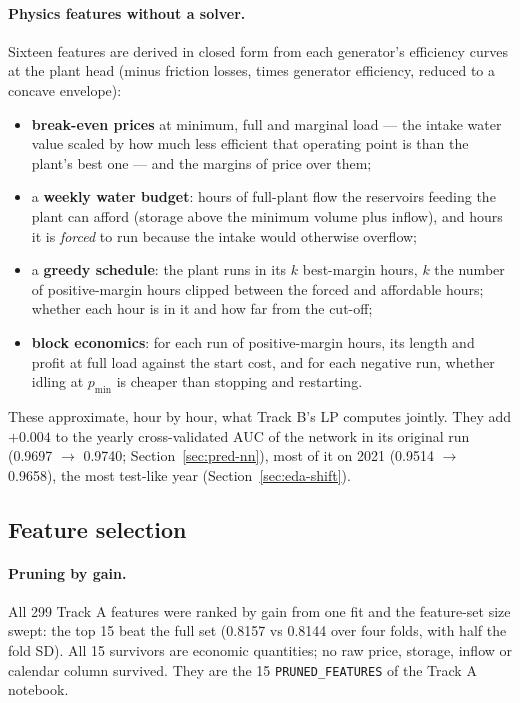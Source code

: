 \documentclass[11pt]{article}
\begin{document}
\paragraph{Physics features without a solver.} Sixteen features are derived in closed form from each
generator's efficiency curves at the plant head (minus friction losses, times generator efficiency,
reduced to a concave envelope):
\begin{itemize}
\item \textbf{break-even prices} at minimum, full and marginal load --- the intake water value scaled
  by how much less efficient that operating point is than the plant's best one --- and the margins of
  price over them;
\item a \textbf{weekly water budget}: hours of full-plant flow the reservoirs feeding the plant can
  afford (storage above the minimum volume plus inflow), and hours it is \emph{forced} to run because
  the intake would otherwise overflow;
\item a \textbf{greedy schedule}: the plant runs in its $k$ best-margin hours, $k$ the number of
  positive-margin hours clipped between the forced and affordable hours; whether each hour is in it
  and how far from the cut-off;
\item \textbf{block economics}: for each run of positive-margin hours, its length and profit at full
  load against the start cost, and for each negative run, whether idling at $p_{\min}$ is cheaper than
  stopping and restarting.
\end{itemize}
These approximate, hour by hour, what Track B's LP computes jointly. They add $+0.004$ to the yearly
cross-validated AUC of the network in its original run (0.9697 $\to$ 0.9740; Section~\ref{sec:pred-nn}),
most of it on 2021 (0.9514 $\to$ 0.9658), the most test-like year (Section~\ref{sec:eda-shift}).

\subsection{Feature selection}
\label{sec:fe-select}

\paragraph{Pruning by gain.} All 299 Track A features were ranked by gain from one fit and
the feature-set size swept: the top 15 beat the full set (0.8157 vs 0.8144 over four folds, with half
the fold SD). All 15 survivors are economic quantities; no raw price, storage, inflow or calendar
column survived. They are the 15 \texttt{PRUNED\_FEATURES} of the Track A notebook.
\end{document}
